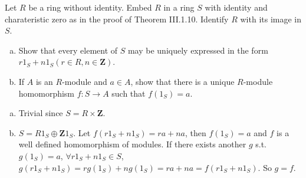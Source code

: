 $$ $$

\begin{ex}
    Let $R$ be a ring without identity. Embed $R$ in a ring $S$ with identity and charateristic zero as in the proof of Theorem III.1.10. Identify $R$ with its image in $S$.
    \begin{enumerate}[(a)]
        \item Show that every element of $S$ may be uniquely expressed in the form $r1_{S}+n1_{S}(r\in R, n\in \mathbf{Z})$.
        \item If $A$ is an $R$-module and $a\in A$, show that there is a unique $R$-module homomorphism $f:S\to A$ such that $f(1_{S})=a$.
    \end{enumerate}
\end{ex}

\begin{answer}
    \begin{enumerate}[(a)]
        \item Trivial since $S=R\times \mathbf{Z}$.
        \item $S=R1_{S}\oplus\mathbf{Z}1_{S}$. Let $f(r1_{S}+n1_{S})=ra+na$, then $f(1_{S})=a$ and $f$ is a well defined homomorphism of modules. If there exists another $g$ s.t. $g(1_{S})=a$, $\forall r1_{S}+n1_{S}\in S$, $g(r1_{S}+n1_{S})=rg(1_{S})+ng(1_{S})=ra+na=f(r1_{S}+n1_{S})$. So $g=f$.
    \end{enumerate}
\end{answer}